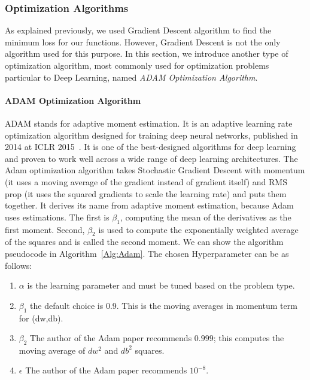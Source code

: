 \subsubsection{Optimization Algorithms}
As explained previously, we used Gradient Descent algorithm to find the minimum loss for our functions. However, Gradient Descent is not the only algorithm used for this purpose. In this section, we introduce another type of optimization algorithm, most commonly used for optimization problems particular to Deep Learning, named \textit{ADAM Optimization Algorithm}.

\paragraph{ADAM Optimization Algorithm}
ADAM stands for adaptive moment estimation. It is an adaptive learning rate optimization algorithm designed for training deep neural networks, published in 2014 at ICLR 2015~\cite{Adam_2014}. It is one of the best-designed algorithms for deep learning and proven to work well across a wide range of deep learning architectures. The Adam optimization algorithm takes Stochastic Gradient Descent with momentum (it uses a moving average of the gradient instead of gradient itself) and RMS prop (it uses the squared gradients to scale the learning rate) and puts them together. It derives its name from adaptive moment estimation, because Adam uses estimations. The first is $\beta_1$, computing the mean of the derivatives as the first moment. Second, $\beta_2$ is used to compute the exponentially weighted average of the squares and is called the second moment. We can show the algorithm pseudocode in Algorithm~\ref{Alg:Adam}. The chosen Hyperparameter can be as follows:

\begin{enumerate}
\item $\alpha$ is the learning parameter and must be tuned based on the problem type.
\item $\beta_1$ the default choice is 0.9. This is the moving averages in momentum term for (dw,db).
\item $\beta_2$ The author of the Adam paper recommends $0.999$; this computes the moving average of $dw^2$ and $db^2$ squares.
\item $\epsilon$ The author of the Adam paper recommends $10^{-8}$.
\end{enumerate}%

